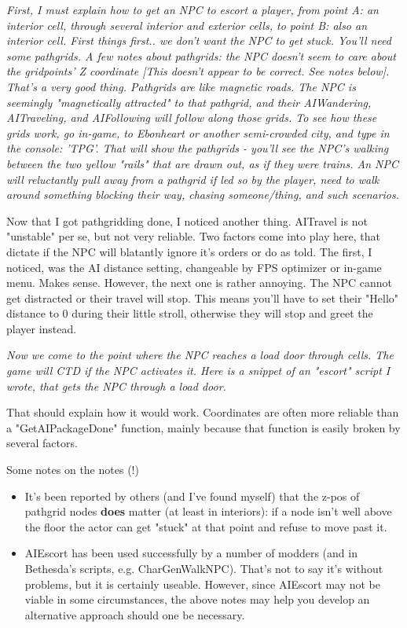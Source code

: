 \emph{\hfill\break
First, I must explain how to get an NPC to escort a player, from point
A: an interior cell, through several interior and exterior cells, to
point B: also an interior cell. First things first.. we don't want the
NPC to get stuck. You'll need some pathgrids. A few notes about
pathgrids: the NPC doesn't seem to care about the gridpoints' Z
coordinate {[}This doesn't appear to be correct. See notes below{]}.
That's a very good thing. Pathgrids are like magnetic roads. The NPC is
seemingly "magnetically attracted" to that pathgrid, and their
AIWandering, AITraveling, and AIFollowing will follow along those grids.
To see how these grids work, go in-game, to Ebonheart or another
semi-crowded city, and type in the console: 'TPG'. That will show the
pathgrids - you'll see the NPC's walking between the two yellow "rails"
that are drawn out, as if they were trains. An NPC will reluctantly pull
away from a pathgrid if led so by the player, need to walk around
something blocking their way, chasing someone/thing, and such
scenarios.}

Now that I got pathgridding done, I noticed another thing. AITravel is
not "unstable" per se, but not very reliable. Two factors come into play
here, that dictate if the NPC will blatantly ignore it's orders or do as
told. The first, I noticed, was the AI distance setting, changeable by
FPS optimizer or in-game menu. Makes sense. However, the next one is
rather annoying. The NPC cannot get distracted or their travel will
stop. This means you'll have to set their "Hello" distance to 0 during
their little stroll, otherwise they will stop and greet the player
instead.

\emph{\hfill\break
Now we come to the point where the NPC reaches a load door through
cells. The game will CTD if the NPC activates it. Here is a snippet of
an "escort" script I wrote, that gets the NPC through a load door.}



That should explain how it would work. Coordinates are often more
reliable than a "GetAIPackageDone" function, mainly because that
function is easily broken by several factors.

Some notes on the notes (!)

\begin{itemize}
\item
  It's been reported by others (and I've found myself) that the z-pos of
  pathgrid nodes \textbf{does} matter (at least in interiors): if a node
  isn't well above the floor the actor can get "stuck" at that point and
  refuse to move past it.
\item
  AIEscort has been used successfully by a number of modders (and in
  Bethesda's scripts, e.g. CharGenWalkNPC). That's not to say it's
  without problems, but it is certainly useable. However, since AIEscort
  may not be viable in some circumstances, the above notes may help you
  develop an alternative approach should one be necessary.
\end{itemize}

